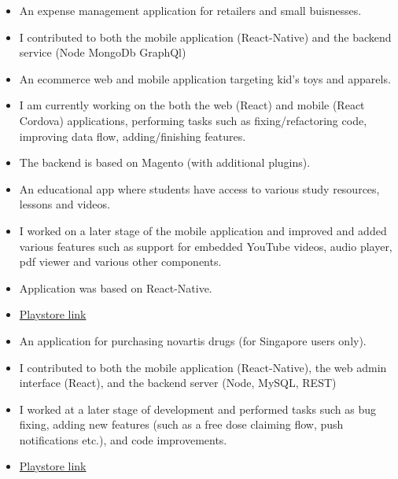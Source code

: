 \documentclass[10pt,a4paper,ragged2e]{altacv}
\begin{document}
\begin{itemize}
\item An expense management application for retailers and small buisnesses.
\item I contributed to both the mobile application (React-Native) and the backend service (Node MongoDb GraphQl) 
\end{itemize}
\smallskip
\smallskip 


\begin{itemize}
\item An ecommerce web and mobile application targeting kid's toys and apparels. 
\item I am currently working on the both the web (React) and mobile (React Cordova) applications, performing tasks such as fixing/refactoring code, improving data flow, adding/finishing features. 
\item The backend is based on Magento (with additional plugins). 
\end{itemize}
\smallskip
\smallskip 




\begin{itemize}
\item An educational app where students have access to various study resources, lessons and videos. 
\item I worked on a later stage of the mobile application and improved and added various features such as support for embedded YouTube videos, audio player, pdf viewer and various other components. 
\item Application was based on React-Native. 
\item \href{https://play.google.com/store/apps/details?id=com.leap.skills}{Playstore link}
\end{itemize}
\smallskip
\smallskip 


\begin{itemize}
\item An application for purchasing novartis drugs (for Singapore users only). 
\item I contributed to both the mobile application (React-Native), the web admin interface (React), and the backend server (Node, MySQL, REST)
\item I worked at a later stage of development and performed tasks such as bug fixing, adding new features (such as a free dose claiming flow, push notifications etc.), and code improvements. 
\item \href{https://play.google.com/store/apps/details?id=com.novartispsp}{Playstore link}
\end{itemize}
\smallskip
\smallskip 
\end{document}

